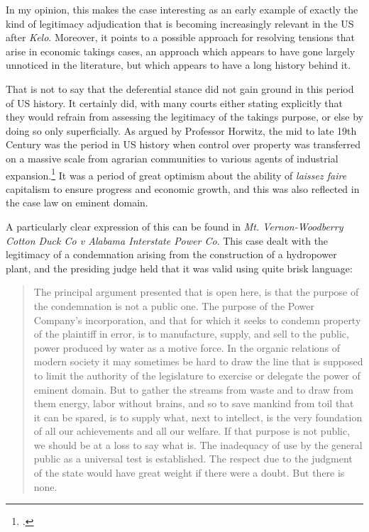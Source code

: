 In my opinion, this makes the case interesting as an early example of exactly the kind of legitimacy adjudication that is becoming increasingly relevant in the US after {\it Kelo}. Moreover, it points to a possible approach for resolving tensions that arise in economic takings cases, an approach which appears to have gone largely unnoticed in the literature, but which appears to have a long history behind it. 

That is not to say that the deferential stance did not gain ground in this period of US history. It certainly did, with many courts either stating explicitly that they would refrain from assessing the legitimacy of the takings purpose, or else by doing so only superficially.  
As argued by Professor Horwitz, the mid to late 19th Century was the period in US history when control over property was transferred on a massive scale from agrarian communities to various agents of industrial expansion.\footcite{horwitz73} It was a period of great optimism about the ability of {\it laissez faire} capitalism to ensure progress and economic growth, and this was also reflected in the case law on eminent domain. 

A particularly clear expression of this can be found in {\it Mt. Vernon-Woodberry Cotton Duck Co v Alabama Interstate Power Co}.  This case dealt with the legitimacy of a condemnation arising from the construction of a hydropower plant, and the presiding judge held that it was valid using quite brisk language:

\begin{quote}The principal argument presented that is open here, is that the purpose of the condemnation is not a public one. The purpose of the Power Company's incorporation, and that for which it seeks to condemn property of the plaintiff in error, is to manufacture, supply, and sell to the public, power produced by water as a motive force. In the organic relations of modern society it may sometimes be hard to draw the line that is supposed to limit the authority of the legislature to exercise or delegate the power of eminent domain. But to gather the streams from waste and to draw from them energy, labor without brains, and so to save mankind from toil that it can be spared, is to supply what, next to intellect, is the very foundation of all our achievements and all our welfare. If that purpose is not public, we should be at a loss to say what is. The inadequacy of use by the general public as a universal test is established. The respect due to the judgment of the state would have great weight if there were a doubt. But there is none.
\end{quote}

